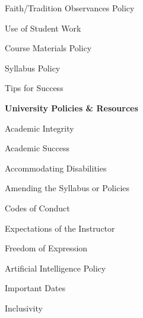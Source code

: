 \documentclass[11pt,letterpaper]{article}
\begin{document}
\begin{minipage}[t]{0.45\textwidth}
\hspace{0.3cm} Faith/Tradition Observances Policy \dotfill \pageref{faith} \par
\hspace{0.3cm} Use of Student Work \dotfill \pageref{std_work} \par
\end{minipage} \hfill \begin{minipage}[t]{0.45\textwidth} \par %
\hspace{0.3cm} Course Materials Policy \dotfill \pageref{copyright} \par
\hspace{0.3cm} Syllabus Policy \dotfill \pageref{syllabus} \par
\hspace{0.3cm} Tips for Success \dotfill \pageref{tips} \par
{\bfseries\color{scred} University Policies \& Resources} \dotfill \pageref{univ_policies} \par
\hspace{0.3cm} Academic Integrity \dotfill \pageref{univ_academicintegrity} \par
\hspace{0.3cm} Academic Success \dotfill \pageref{univ_success} \par
\hspace{0.3cm} Accommodating Disabilities \dotfill \pageref{univ_ada} \par
\hspace{0.3cm} Amending the Syllabus or Policies \dotfill \pageref{univ_amending} \par
\hspace{0.3cm} Codes of Conduct \dotfill \pageref{univ_conduct} \par
\hspace{0.3cm} Expectations of the Instructor \dotfill \pageref{univ_instructorexp} \par
\hspace{0.3cm} Freedom of Expression \dotfill \pageref{univ_freedexpression} \par
\hspace{0.3cm} Artificial Intelligence Policy \dotfill \pageref{univ_artintel} \par
\hspace{0.3cm} Important Dates \dotfill \pageref{univ_dates} \par
\hspace{0.3cm} Inclusivity \dotfill \pageref{univ_inclusion} \par

\end{minipage}
\end{document}
